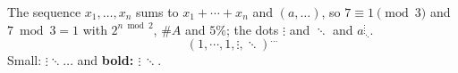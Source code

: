 \documentclass[12pt]{article}
\begin{document}
The sequence $x_1,\dots,x_n$ sums to $x_1+\cdots+x_n$ and $(a,\ldots)$, so $7\equiv 1\pmod 3$ and $7\bmod 3=1$
with $2^{n\bmod 2}$, $\#A$ and $5\%$; the dots $\vdots$ and $\ddots$ and $a^{\vdots}_{\ddots}$.
\[ \left( 1, \cdots, 1, \vdots, \ddots \right)^{\dots} \]
{\small Small: $\vdots\ddots\dots$} and \textbf{bold: $\vdots\,\ddots$}.
\end{document}
